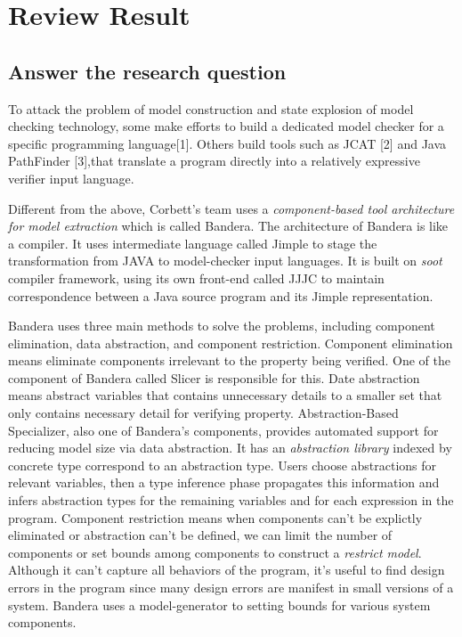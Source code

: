 \documentclass{article}
\begin{document}
\section{Review Result}

\subsection{Answer the research question}
To attack the problem of model construction and state explosion of model checking technology, some make efforts to build a dedicated model checker for a specific programming language[1]. Others build tools such as JCAT [2] 
and Java PathFinder [3],that translate a program directly into a relatively expressive verifier input language. 


Different from the above, Corbett's team uses a {\itshape component-based tool architecture for model extraction} which is called Bandera. The architecture of Bandera is like a compiler. It uses intermediate language called Jimple to stage the transformation from JAVA to model-checker input languages. It is built on {\itshape soot} compiler framework, using its own front-end called JJJC to maintain correspondence between a Java source program and its Jimple representation. 


Bandera uses three main methods to solve the problems, including component elimination, data abstraction, and component restriction. Component elimination means eliminate components irrelevant to the property being verified. One of the component of Bandera called Slicer is responsible for this. Date abstraction means abstract variables that contains unnecessary details to a smaller set that only contains necessary detail for verifying property. Abstraction-Based Specializer, also one of Bandera's components, provides automated support for reducing model size via data abstraction. It has an {\itshape abstraction library} indexed by concrete type correspond to an abstraction type. Users choose abstractions for relevant variables, then a type inference phase propagates this information and infers abstraction types for the remaining variables and for each expression in the program. Component restriction means when components can't be explictly eliminated or abstraction can't be defined, we can limit the number of components or set bounds among components to construct a {\itshape restrict model}. Although it can't capture all behaviors of the program, it's useful to find design errors in the program since many design errors are manifest in small versions of a system. Bandera uses a model-generator to setting bounds for various system components.
\end{document}
